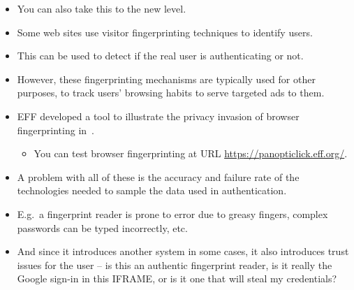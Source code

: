\documentclass{beamer}
\begin{document}
\begin{frame}
  \begin{itemize}
    \item You can also take this to the new level.

    \item Some web sites use visitor fingerprinting techniques to identify 
      users.

    \item This can be used to detect if the real user is authenticating or not.

    \item However, these fingerprinting mechanisms are typically used for other 
      purposes, to track users' browsing habits to serve targeted ads to them.

    \item EFF developed a tool to illustrate the privacy invasion of browser 
      fingerprinting in~\cite{Eckersley2010hui}.
      \begin{itemize}
        \item You can test browser fingerprinting at URL 
          \url{https://panopticlick.eff.org/}.
      \end{itemize}

  \end{itemize}
\end{frame}

\begin{frame}
  \begin{itemize}
    \item A problem with all of these is the accuracy and failure rate of the 
      technologies needed to sample the data used in authentication.

    \item E.g.\ a fingerprint reader is prone to error due to greasy fingers, 
      complex passwords can be typed incorrectly, etc.

    \item And since it introduces another system in some cases, it also 
      introduces trust issues for the user -- is this an authentic fingerprint 
      reader, is it really the Google sign-in in this IFRAME, or is it one that 
      will steal my credentials?

  \end{itemize}
\end{frame}

\end{document}
